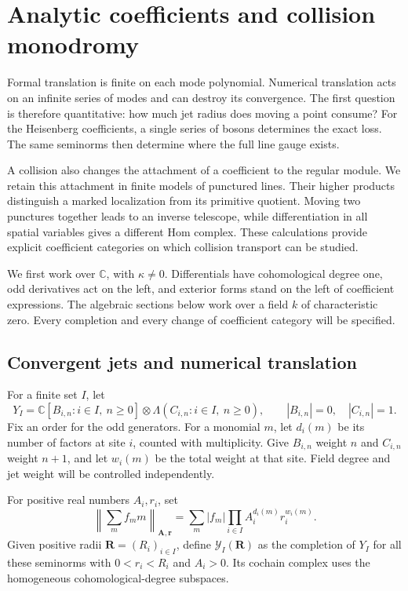 \chapter{Analytic coefficients and collision monodromy}
\label{cbc:chap:analytic}

Formal translation is finite on each mode polynomial. Numerical
translation acts on an infinite series of modes and can destroy its
convergence. The first question is therefore quantitative: how much
jet radius does moving a point consume? For the Heisenberg
coefficients, a single series of bosons determines the exact loss.
The same seminorms then determine where the full line gauge exists.

A collision also changes the attachment of a coefficient to the
regular module. We retain this attachment in finite models of
punctured lines. Their higher products distinguish a marked
localization from its primitive quotient. Moving two punctures
together leads to an inverse telescope, while differentiation in
all spatial variables gives a different Hom complex. These
calculations provide explicit coefficient categories on which
collision transport can be studied.

We first work over $\mathbb C$, with $\kappa\ne0$. Differentials
have cohomological degree one, odd derivatives act on the left,
and exterior forms stand on the left of coefficient expressions.
The algebraic sections below work over a field $k$ of characteristic
zero. Every completion and every change of coefficient category
will be specified.

\section{Convergent jets and numerical translation}
\label{cbc:ac:completion}

For a finite set $I$, let
\[
 Y_I=\mathbb C[B_{i,n}:i\in I,\ n\geq0]
          \otimes\Lambda(C_{i,n}:i\in I,\ n\geq0),
 \qquad |B_{i,n}|=0,\quad |C_{i,n}|=1.
\]
Fix an order for the odd generators. For a monomial $m$, let
$d_i(m)$ be its number of factors at site $i$, counted with
multiplicity. Give $B_{i,n}$ weight $n$ and $C_{i,n}$ weight
$n+1$, and let $w_i(m)$ be the total weight at that site.
Field degree and jet weight will be controlled independently.

\begin{definition}\label{cbc:ac:seminorms}
For positive real numbers $A_i,r_i$, set
\[
 \left\|\sum_m f_m m\right\|_{\mathbf A,\mathbf r}
      =\sum_m |f_m|\prod_{i\in I}
                       A_i^{d_i(m)}r_i^{w_i(m)}.
\]
Given positive radii $\mathbf R=(R_i)_{i\in I}$, define
$\mathcal Y_I(\mathbf R)$ as the completion of $Y_I$ for
all these seminorms with $0<r_i<R_i$ and $A_i>0$.
Its cochain complex uses the homogeneous cohomological-degree
subspaces.
\end{definition}

